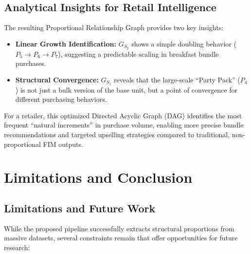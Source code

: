 \documentclass[10pt, twocolumn]{article}
\begin{document}
\subsection{Analytical Insights for Retail Intelligence}

The resulting Proportional Relationship Graph provides two key insights:

\begin{itemize}
    \item \textbf{Linear Growth Identification:} $G_{S_2}$ shows a simple
          doubling behavior ($P_5 \rightarrow P_6 \rightarrow P_7$), suggesting a
          predictable scaling in breakfast bundle purchases.
    \item \textbf{Structural Convergence:} $G_{S_1}$ reveals that the
          large-scale ``Party Pack'' ($P_4$) is not just a bulk version of the base unit,
          but a point of convergence for different purchasing behaviors.
\end{itemize}

For a retailer, this optimized Directed Acyclic Graph (DAG) identifies the most
frequent ``natural increments'' in purchase volume, enabling more precise
bundle recommendations and targeted upselling strategies compared to
traditional, non-proportional FIM outputs.

\section{Limitations and Conclusion}

\subsection{Limitations and Future Work}

While the proposed pipeline successfully extracts structural proportions from
massive datasets, several constraints remain that offer opportunities for
future research:
\end{document}
